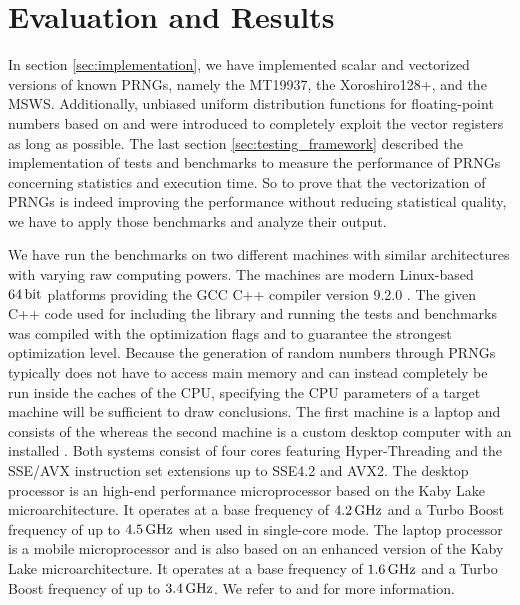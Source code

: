 \documentclass{stdlocal}
\begin{document}
\section{Evaluation and Results} %
\label{sec:evaluation}
  \autocite{compiler-explorer,intel-intrinsics-guide,perfevent,vandevoorde2018,meyers2014}

  In section \ref{sec:implementation}, we have implemented scalar and vectorized versions of known PRNGs, namely the MT19937, the Xoroshiro128+, and the MSWS.
  Additionally, unbiased uniform distribution functions for floating-point numbers based on \textcite[\ppno~55-56]{kneusel2018} and \textcite{vigna-xoroshiro} were introduced to completely exploit the vector registers as long as possible.
  The last section \ref{sec:testing_framework} described the implementation of tests and benchmarks to measure the performance of PRNGs concerning statistics and execution time.
  So to prove that the vectorization of PRNGs is indeed improving the performance without reducing statistical quality, we have to apply those benchmarks and analyze their output.

  We have run the benchmarks on two different machines with similar architectures with varying raw computing powers.
  The machines are modern Linux-based $64\, \mathrm{bit}$ platforms providing the GCC C++ compiler version 9.2.0 \autocite{gcc}.
  The given C++ code used for including the library and running the tests and benchmarks was compiled with the optimization flags  and  to guarantee the strongest optimization level.
  Because the generation of random numbers through PRNGs typically does not have to access main memory and can instead completely be run inside the caches of the CPU, specifying the CPU parameters of a target machine will be sufficient to draw conclusions.
  The first machine is a laptop and consists of the  \autocite{intel-kaby-lake-i5} whereas the second machine is a custom desktop computer with an installed  \autocite{intel-kaby-lake-i7}.
  Both systems consist of four cores featuring Hyper-Threading and the SSE/AVX instruction set extensions up to SSE4.2 and AVX2.
  The desktop processor is an high-end performance microprocessor based on the Kaby Lake microarchitecture.
  It operates at a base frequency of $4.2\, \mathrm{GHz}$ and a Turbo Boost frequency of up to $4.5\, \mathrm{GHz}$ when used in single-core mode.
  The laptop processor is a mobile microprocessor and is also based on an enhanced version of the Kaby Lake microarchitecture.
  It operates at a base frequency of $1.6\, \mathrm{GHz}$ and a Turbo Boost frequency of up to $3.4\, \mathrm{GHz}$.
  We refer to \textcite{intel-kaby-lake-i5} and \textcite{intel-kaby-lake-i7} for more information.
\end{document}
